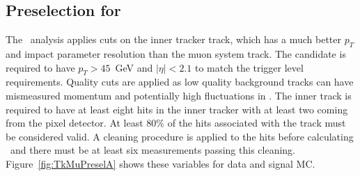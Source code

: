 \subsection{Preselection for \tktof\ \label{sec:tktofpreselection}}

The \tktof\ analysis applies cuts on the inner tracker track, which has a much better $p_T$ and impact parameter resolution than the muon system track.
The candidate is required to have $p_T > 45$~GeV and  $|\eta| < 2.1$ to match the trigger level requirements. 
Quality cuts are applied as low quality background tracks can have mismeasured momentum and potentially high fluctuations in \dedx.
The inner track is required to have at least eight hits in the inner tracker with at least two coming from the pixel detector. At least 80\% of the hits associated with the track
must be considered valid. A cleaning procedure is applied to the hits before calculating \dedx\ and there must be at least six measurements passing this cleaning.
Figure~\ref{fig:TkMuPreselA} shows these variables for data and signal MC.

